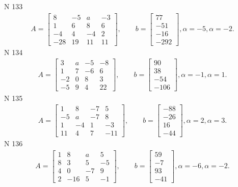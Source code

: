 \documentclass[11pt]{report}
\begin{document}
N 133
\begin{align*}
 A = \left[\begin{matrix}8 & -5 & a & -3\\1 & 6 & 8 & 6\\-4 & 4 & -4 & 2\\-28 & 19 & 11 & 11\end{matrix}\right],
    \qquad b = \left[\begin{matrix}77\\-51\\-16\\-292\end{matrix}\right], \alpha = -5, \alpha = -2. 
 \end{align*}
N 134
\begin{align*}
 A = \left[\begin{matrix}3 & a & -5 & -8\\1 & 7 & -6 & 6\\-2 & 0 & 8 & 3\\-5 & 9 & 4 & 22\end{matrix}\right],
    \qquad b = \left[\begin{matrix}90\\38\\-54\\-106\end{matrix}\right], \alpha = -1, \alpha = 1. 
 \end{align*}
N 135
\begin{align*}
 A = \left[\begin{matrix}1 & 8 & -7 & 5\\-5 & a & -7 & 8\\1 & -4 & 1 & -3\\11 & 4 & 7 & -11\end{matrix}\right],
    \qquad b = \left[\begin{matrix}-88\\-26\\16\\-44\end{matrix}\right], \alpha = 2, \alpha = 3. 
 \end{align*}
N 136
\begin{align*}
 A = \left[\begin{matrix}1 & 8 & a & 5\\8 & 3 & 5 & -5\\4 & 0 & -7 & 9\\2 & -16 & 5 & -1\end{matrix}\right],
    \qquad b = \left[\begin{matrix}59\\-7\\93\\-41\end{matrix}\right], \alpha = -6, \alpha = -2. 
 \end{align*}
\end{document}

